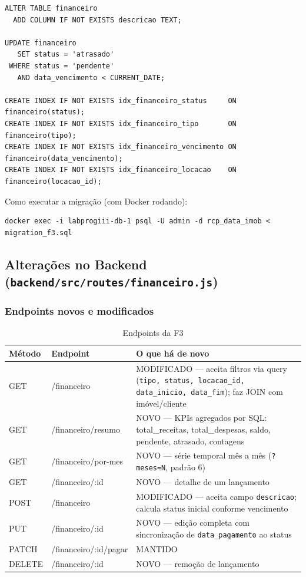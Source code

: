 \documentclass[12pt, a4paper]{article}
\newcommand{\thead}[1]{\cellcolor{tableheader}\color{white}\bfseries #1}
\newcommand{\talt}{\rowcolor{tablerowalt}}
\begin{document}
\begin{lstlisting}[language=SQL2]
ALTER TABLE financeiro
  ADD COLUMN IF NOT EXISTS descricao TEXT;

UPDATE financeiro
   SET status = 'atrasado'
 WHERE status = 'pendente'
   AND data_vencimento < CURRENT_DATE;

CREATE INDEX IF NOT EXISTS idx_financeiro_status     ON financeiro(status);
CREATE INDEX IF NOT EXISTS idx_financeiro_tipo       ON financeiro(tipo);
CREATE INDEX IF NOT EXISTS idx_financeiro_vencimento ON financeiro(data_vencimento);
CREATE INDEX IF NOT EXISTS idx_financeiro_locacao    ON financeiro(locacao_id);
\end{lstlisting}

Como executar a migração (com Docker rodando):

\begin{lstlisting}
docker exec -i labprogiii-db-1 psql -U admin -d rcp_data_imob < migration_f3.sql
\end{lstlisting}

\subsection{Alterações no Backend (\texttt{backend/src/routes/financeiro.js})}

\subsubsection{Endpoints novos e modificados}

\begin{table}[H]
\centering
\begin{tabularx}{\textwidth}{|l|l|X|}
\hline
\thead{Método} & \thead{Endpoint} & \thead{O que há de novo} \\
\hline
GET    & /financeiro            & MODIFICADO — aceita filtros via query (\texttt{tipo, status, locacao\_id, data\_inicio, data\_fim}); faz JOIN com imóvel/cliente \\
\talt GET    & /financeiro/resumo     & NOVO — KPIs agregados por SQL: total\_receitas, total\_despesas, saldo, pendente, atrasado, contagens \\
GET    & /financeiro/por-mes    & NOVO — série temporal mês a mês (\texttt{?meses=N}, padrão 6) \\
\talt GET    & /financeiro/:id        & NOVO — detalhe de um lançamento \\
POST   & /financeiro            & MODIFICADO — aceita campo \texttt{descricao}; calcula status inicial conforme vencimento \\
\talt PUT    & /financeiro/:id        & NOVO — edição completa com sincronização de \texttt{data\_pagamento} ao status \\
PATCH  & /financeiro/:id/pagar  & MANTIDO \\
\talt DELETE & /financeiro/:id        & NOVO — remoção de lançamento \\
\hline
\end{tabularx}
\caption{Endpoints da F3}
\end{table}
\end{document}
